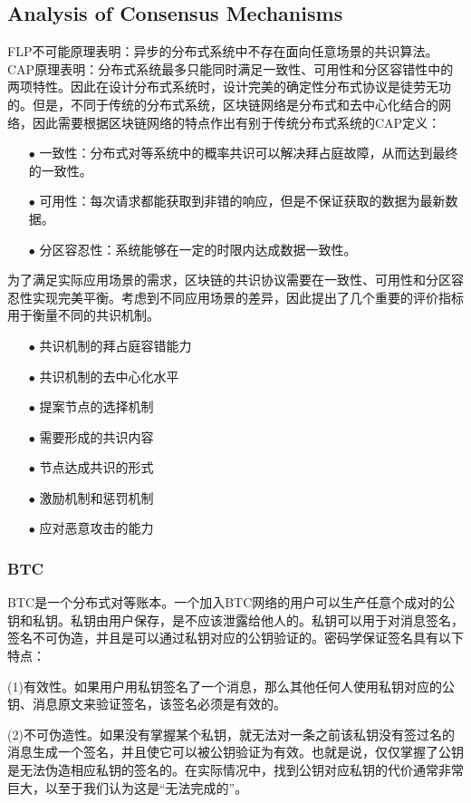 \documentclass[a4paper,twoside]{scrbook}
\begin{document}
\begin{CJK}{UTF8}{gbsn}
\subsection{Analysis of Consensus Mechanisms}
FLP不可能原理表明：异步的分布式系统中不存在面向任意场景的共识算法。CAP原理表明：分布式系统最多只能同时满足一致性、可用性和分区容错性中的两项特性。因此在设计分布式系统时，设计完美的确定性分布式协议是徒劳无功的。但是，不同于传统的分布式系统，区块链网络是分布式和去中心化结合的网络，因此需要根据区块链网络的特点作出有别于传统分布式系统的CAP定义：
\begin{itemize}
\item[$\bullet$]一致性：分布式对等系统中的概率共识可以解决拜占庭故障，从而达到最终的一致性。
\item[$\bullet$]可用性：每次请求都能获取到非错的响应，但是不保证获取的数据为最新数据。
\item[$\bullet$]分区容忍性：系统能够在一定的时限内达成数据一致性。
\end{itemize}

为了满足实际应用场景的需求，区块链的共识协议需要在一致性、可用性和分区容忍性实现完美平衡。考虑到不同应用场景的差异，因此提出了几个重要的评价指标用于衡量不同的共识机制。
\begin{itemize}
\item[$\bullet$]共识机制的拜占庭容错能力
\item[$\bullet$]共识机制的去中心化水平
\item[$\bullet$]提案节点的选择机制
\item[$\bullet$]需要形成的共识内容
\item[$\bullet$]节点达成共识的形式
\item[$\bullet$]激励机制和惩罚机制
\item[$\bullet$]应对恶意攻击的能力
\end{itemize}

\subsubsection{BTC}
BTC是一个分布式对等账本。一个加入BTC网络的用户可以生产任意个成对的公钥和私钥。私钥由用户保存，是不应该泄露给他人的。私钥可以用于对消息签名，签名不可伪造，并且是可以通过私钥对应的公钥验证的。密码学保证签名具有以下特点：

(1)有效性。如果用户用私钥签名了一个消息，那么其他任何人使用私钥对应的公钥、消息原文来验证签名，该签名必须是有效的。

(2)不可伪造性。如果没有掌握某个私钥，就无法对一条之前该私钥没有签过名的消息生成一个签名，并且使它可以被公钥验证为有效。也就是说，仅仅掌握了公钥是无法伪造相应私钥的签名的。在实际情况中，找到公钥对应私钥的代价通常非常巨大，以至于我们认为这是“无法完成的”。


\end{CJK}
\end{document}
